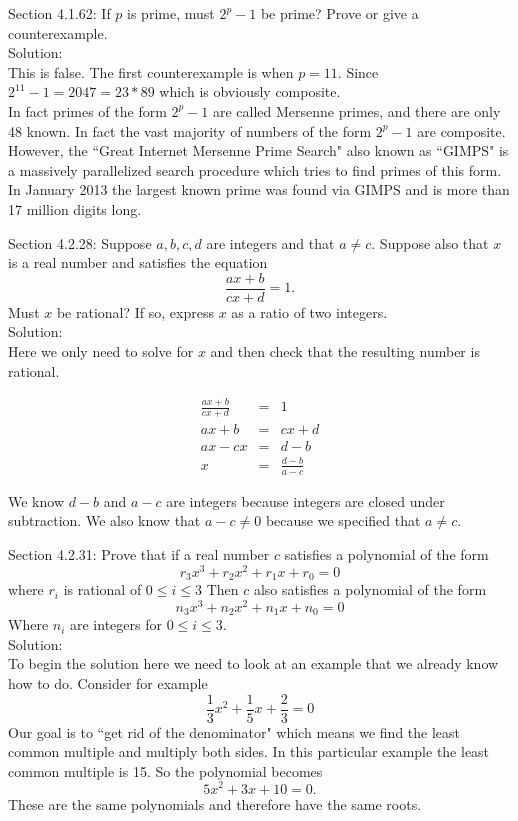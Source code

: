 \documentclass[10 pt]{amsart}
\theoremstyle{definition}
\theoremstyle{remark}
\numberwithin{equation}{subsection}
\begin{document}
\newpage

Section 4.1.62: If $p$ is prime, must $2^p -1$ be prime?  Prove or give a counterexample.\\

Solution:\\
This is false.  The first counterexample is when $p=11$.  Since $2^{11} - 1 = 2047 = 23*89$ which is obviously composite.\\
In fact primes of the form $2^p-1$ are called Mersenne primes, and there are only 48 known.  In fact the vast majority of numbers of the form $2^p-1$ are composite.  However, the ``Great Internet Mersenne Prime Search" also known as ``GIMPS" is a massively parallelized search procedure which tries to find primes of this form.  In January 2013 the largest known prime was found via GIMPS and is more than 17 million digits long.

\newpage

Section 4.2.28: Suppose $a,b,c,d$ are integers and that $a\neq c$.  Suppose also that $x$ is a real number and satisfies the equation
\[
\frac{ax+b}{cx+d} =1.
\]
Must $x$ be rational?  If so, express $x$ as a ratio of two integers.\\


Solution:\\
Here we only need to solve for $x$ and then check that the resulting number is rational.

\begin{eqnarray*}
\frac{ax+b}{cx+d} & = & 1\\
ax+b & = & cx+d\\
ax-cx & = & d-b\\
x & = & \frac{d-b}{a-c}
\end{eqnarray*}

We know $d-b$ and $a-c$ are integers because integers are closed under subtraction.  We also know that $a-c \neq 0$ because we specified that $a\neq c$.


\newpage

Section 4.2.31: Prove that if a real number $c$ satisfies a polynomial of the form
\[
r_3 x^3 + r_2 x^2 + r_1 x + r_0 = 0
\]
where $r_i$ is rational of $0\leq i \leq 3$
Then $c$ also satisfies a polynomial of the form
\[
n_3 x^3 + n_2 x^2 + n_1 x+ n_0 = 0
\]
Where $n_i$ are integers for $0\leq i \leq 3$.\\

Solution:\\
To begin the solution here we need to look at an example that we already know how to do.  Consider for example
\[
\frac{1}{3} x^2 + \frac{1}{5}x + \frac{2}{3} = 0
\]
Our goal is to ``get rid of the denominator" which means we find the least common multiple and multiply both sides.  In this particular example the least common multiple is 15.  So the polynomial becomes
\[
5x^2 + 3x + 10 = 0.
\]
These are the same polynomials and therefore have the same roots.\\
\end{document}
